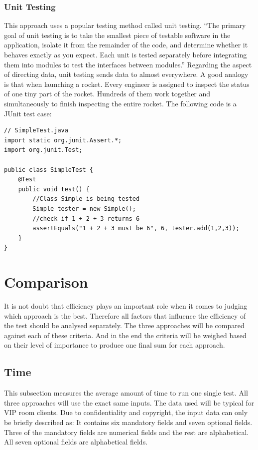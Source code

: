 \documentclass[12pt]{article}
\begin{document}
\subsubsection{Unit Testing}
This approach uses a popular testing method called unit testing. “The primary goal of unit testing is to take the smallest piece of testable software in the application, isolate it from the remainder of the code, and determine whether it behaves exactly as you expect. Each unit is tested separately before integrating them into modules to test the interfaces between modules.”\cite{unit} Regarding the aspect of directing data, unit testing sends data to almost everywhere. A good analogy is that when launching a rocket. Every engineer is assigned to inspect the status of one tiny part of the rocket. Hundreds of them work together and simultaneously to finish inspecting the entire rocket. The following code is a JUnit test case:\\
\begin{lstlisting}
// SimpleTest.java
import static org.junit.Assert.*;
import org.junit.Test;

public class SimpleTest {
	@Test
	public void test() {
		//Class Simple is being tested
		Simple tester = new Simple();
		//check if 1 + 2 + 3 returns 6
		assertEquals("1 + 2 + 3 must be 6", 6, tester.add(1,2,3));
	}
}
\end{lstlisting}
\newpage

\section{Comparison}
It is not doubt that efficiency plays an important role when it comes to judging which approach is the best. Therefore all factors that influence the efficiency of the test should be analysed separately.  The three approaches will be compared against each of these criteria. And in the end the criteria will be weighed based on their level of importance to produce one final sum for each approach.\\
\subsection{Time}
This subsection measures the average amount of time to run one single test. All three approaches will use the exact same inputs. The data used will be typical for VIP room clients. Due to confidentiality and copyright, the input data can only be briefly described as:  It contains six mandatory fields and seven optional fields. Three of the mandatory fields are numerical fields and the rest are alphabetical. All seven optional fields are alphabetical fields.\\
\end{document}
